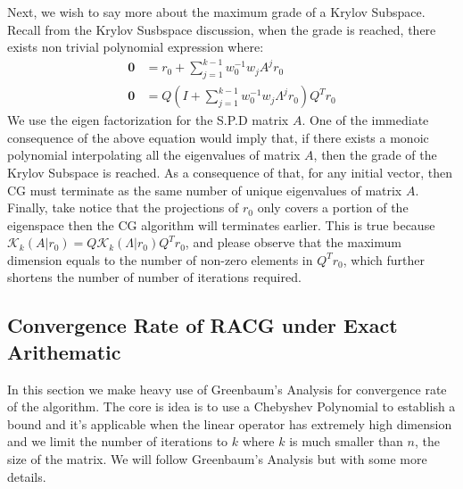 \documentclass[]{article}
\theoremstyle{definition}
\begin{document}
        \par
        Next, we wish to say more about the maximum grade of a Krylov Subspace. Recall from the Krylov Susbspace discussion, when the grade is reached, there exists non trivial polynomial expression where: 
        $$
        \begin{aligned}
            \mathbf 0 &= r_0 + \sum_{j = 1}^{k - 1}w_0^{-1}w_jA^jr_0
            \\
            \mathbf 0 &= Q\left(
                I + \sum_{j = 1}^{k - 1}w^{-1}_0w_j\Lambda^jr_0
            \right)Q^Tr_0 
        \end{aligned}
        $$
        We use the eigen factorization for the S.P.D matrix $A$. One of the immediate consequence of the above equation would imply that, if there exists a monoic polynomial interpolating all the eigenvalues of matrix $A$, then the grade of the Krylov Subspace is reached. As a consequence of that, for any initial vector, then CG must terminate as the same number of unique eigenvalues of matrix $A$. Finally, take notice that the projections of $r_0$ only covers a portion of the eigenspace then the CG algorithm will terminates earlier. This is true because $\mathcal K_k(A|r_0) = Q\mathcal K_k(\Lambda| r_0)Q^Tr_0$, and please observe that the maximum dimension equals to the number of non-zero elements in $Q^Tr_0$, which further shortens the number of number of iterations required. 

    \subsection{Convergence Rate of RACG under Exact Arithematic}
        In this section we make heavy use of Greenbaum's Analysis for convergence rate of the algorithm. The core is idea is to use a Chebyshev Polynomial to establish a bound and it's applicable when the linear operator has extremely high dimension and we limit the number of iterations to $k$ where $k$ is much smaller than $n$, the size of the matrix. We will follow Greenbaum's Analysis but with some more details. 
\end{document}
